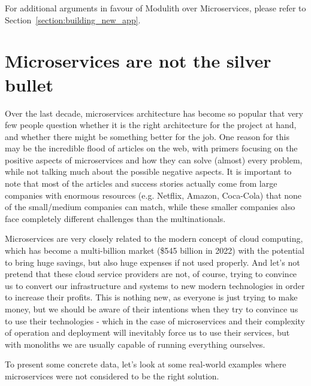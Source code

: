 \begin{note}
    For additional arguments in favour of Modulith over Microservices, please refer to Section~\ref{section:building_new_app}.
\end{note}

\section{Microservices are not the silver bullet}
Over the last decade, microservices architecture has become so popular that very few people question whether it is the right architecture for the project at hand, and whether there might be something better for the job. One reason for this may be the incredible flood of articles on the web, with primers focusing on the positive aspects of microservices and how they can solve (almost) every problem, while not talking much about the possible negative aspects. It is important to note that most of the articles and success stories actually come from large companies with enormous resources (e.g. Netflix, Amazon, Coca-Cola) that none of the small/medium companies can match, while these smaller companies also face completely different challenges than the multinationals.

Microservices are very closely related to the modern concept of cloud computing, which has become a multi-billion market (\$545 billion in 2022\cite{CC_MARKET_SIZE}) with the potential to bring huge savings, but also huge expenses if not used properly. And let's not pretend that these cloud service providers are not, of course, trying to convince us to convert our infrastructure and systems to new modern technologies in order to increase their profits. This is nothing new, as everyone is just trying to make money, but we should be aware of their intentions when they try to convince us to use their technologies - which in the case of microservices and their complexity of operation and deployment will inevitably force us to use their services, but with monoliths we are usually capable of running everything ourselves.

To present some concrete data, let's look at some real-world examples where microservices were not considered to be the right solution.

